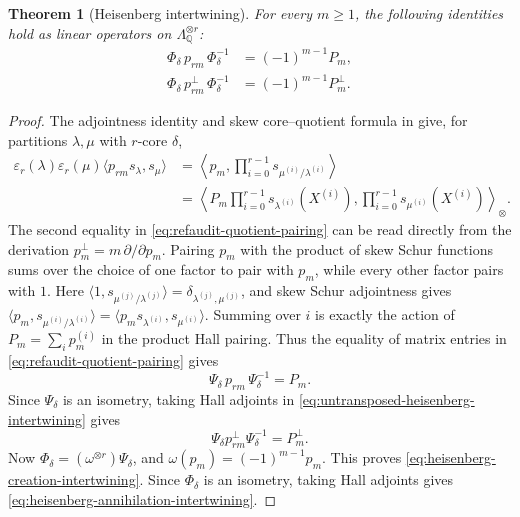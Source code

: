 \documentclass[12pt,reqno,a4paper]{amsart}
\numberwithin{equation}{section}
\numberwithin{figure}{section}
\theoremstyle{plain}
\newtheorem{theorem}{Theorem}[section]
\theoremstyle{definition}
\newcommand{\eps}{\varepsilon}
\begin{document}
\begin{theorem}[Heisenberg intertwining]
\label{thm:quotient-coordinate-action}
For every $m\geq1$, the following identities hold as linear operators
on $\Lambda_{\mathbb Q}^{\otimes r}$:
\begin{align}
 \Phi_\delta\,p_{rm}\,\Phi_\delta^{-1}
 &=(-1)^{m-1}P_m,
 \label{eq:heisenberg-creation-intertwining}\\
 \Phi_\delta\,p_{rm}^{\perp}\,\Phi_\delta^{-1}
 &=(-1)^{m-1}P_m^{\perp}.
 \label{eq:heisenberg-annihilation-intertwining}
\end{align}
\end{theorem}

\begin{proof}
The adjointness identity and skew core--quotient formula in
\cite[Propositions~2.2--2.3, pp.~582--583]{Walker} give, for partitions
$\lambda,\mu$ with $r$-core $\delta$,
\begin{equation}\label{eq:refaudit-quotient-pairing}
\begin{aligned}
 \eps_r(\lambda)\eps_r(\mu)
 \langle p_{rm}s_\lambda,s_\mu\rangle
 &=\left\langle p_m,
      \prod_{i=0}^{r-1}s_{\mu^{(i)}/\lambda^{(i)}}\right\rangle\\
 &=\left\langle
      P_m\prod_{i=0}^{r-1}s_{\lambda^{(i)}}(X^{(i)}),
      \prod_{i=0}^{r-1}s_{\mu^{(i)}}(X^{(i)})
    \right\rangle_{\otimes}.
\end{aligned}
\end{equation}
The second equality in \eqref{eq:refaudit-quotient-pairing}
can be read directly from the derivation
$p_m^\perp=m\,\partial/\partial p_m$.
Pairing $p_m$ with the product of skew Schur functions sums over
the choice of one factor to pair with $p_m$, while every other
factor pairs with $1$.
Here $\langle1,s_{\mu^{(j)}/\lambda^{(j)}}\rangle
=\delta_{\lambda^{(j)},\mu^{(j)}}$, and skew Schur adjointness gives
$\langle p_m,s_{\mu^{(i)}/\lambda^{(i)}}\rangle
=\langle p_m s_{\lambda^{(i)}},s_{\mu^{(i)}}\rangle$.
Summing over $i$ is exactly the action of $P_m=\sum_i p_m^{(i)}$
in the product Hall pairing.
Thus the equality of matrix entries in
\eqref{eq:refaudit-quotient-pairing} gives
\begin{equation}\label{eq:untransposed-heisenberg-intertwining}
 \Psi_\delta\,p_{rm}\,\Psi_\delta^{-1}=P_m.
\end{equation}
Since $\Psi_\delta$ is an isometry, taking Hall adjoints in
\eqref{eq:untransposed-heisenberg-intertwining} gives
\begin{equation}\label{eq:untransposed-heisenberg-adjoint}
 \Psi_\delta p_{rm}^{\perp}\Psi_\delta^{-1}=P_m^{\perp}.
\end{equation}
Now $\Phi_\delta=(\omega^{\otimes r})\Psi_\delta$, and
$\omega(p_m)=(-1)^{m-1}p_m$.  This proves
\eqref{eq:heisenberg-creation-intertwining}.  Since $\Phi_\delta$ is
an isometry, taking Hall adjoints gives
\eqref{eq:heisenberg-annihilation-intertwining}.
\end{proof}
\end{document}
